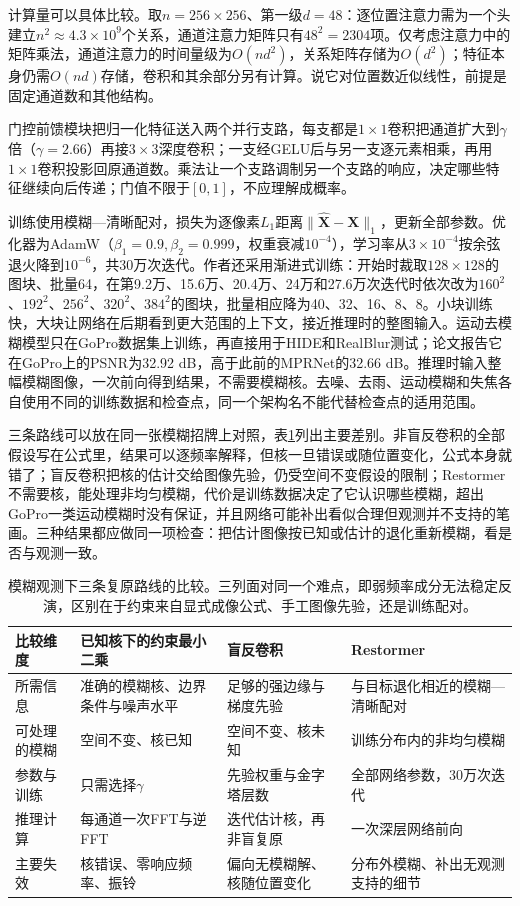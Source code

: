 计算量可以具体比较。取$n=256\times256$、第一级$d=48$：逐位置注意力需为一个头建立$n^2\approx4.3\times10^9$个关系，通道注意力矩阵只有$48^2=2304$项。仅考虑注意力中的矩阵乘法，通道注意力的时间量级为$O(nd^2)$，关系矩阵存储为$O(d^2)$；特征本身仍需$O(nd)$存储，卷积和其余部分另有计算。说它对位置数近似线性，前提是固定通道数和其他结构。

门控前馈模块把归一化特征送入两个并行支路，每支都是$1\times1$卷积把通道扩大到$\gamma$倍（$\gamma=2.66$）再接$3\times3$深度卷积；一支经GELU后与另一支逐元素相乘，再用$1\times1$卷积投影回原通道数。乘法让一个支路调制另一个支路的响应，决定哪些特征继续向后传递；门值不限于$[0,1]$，不应理解成概率。

训练使用模糊—清晰配对，损失为逐像素$L_1$距离$\lVert\widehat{\bm{X}}-\bm{X}\rVert_1$，更新全部参数。优化器为AdamW（$\beta_1=0.9,\beta_2=0.999$，权重衰减$10^{-4}$），学习率从$3\times10^{-4}$按余弦退火降到$10^{-6}$，共30万次迭代。作者还采用渐进式训练：开始时裁取$128\times128$的图块、批量64，在第9.2万、15.6万、20.4万、24万和27.6万次迭代时依次改为$160^2$、$192^2$、$256^2$、$320^2$、$384^2$的图块，批量相应降为40、32、16、8、8。小块训练快，大块让网络在后期看到更大范围的上下文，接近推理时的整图输入。运动去模糊模型只在GoPro数据集上训练，再直接用于HIDE和RealBlur测试；论文报告它在GoPro上的PSNR为32.92 dB，高于此前的MPRNet的32.66 dB。推理时输入整幅模糊图像，一次前向得到结果，不需要模糊核。去噪、去雨、运动模糊和失焦各自使用不同的训练数据和检查点，同一个架构名不能代替检查点的适用范围。

三条路线可以放在同一张模糊招牌上对照，表\ref{tab:vision-deblur-compare}列出主要差别。非盲反卷积的全部假设写在公式里，结果可以逐频率解释，但核一旦错误或随位置变化，公式本身就错了；盲反卷积把核的估计交给图像先验，仍受空间不变假设的限制；Restormer不需要核，能处理非均匀模糊，代价是训练数据决定了它认识哪些模糊，超出GoPro一类运动模糊时没有保证，并且网络可能补出看似合理但观测并不支持的笔画。三种结果都应做同一项检查：把估计图像按已知或估计的退化重新模糊，看是否与观测一致。

\begin{table}[tbp]
 \centering
 \small
 \begin{tabularx}{\linewidth}{@{}p{16mm}XXX@{}}
  \toprule
  比较维度 & 已知核下的约束最小二乘 & 盲反卷积 & Restormer\\
  \midrule
  所需信息 & 准确的模糊核、边界条件与噪声水平 & 足够的强边缘与梯度先验 & 与目标退化相近的模糊—清晰配对\\
  可处理的模糊 & 空间不变、核已知 & 空间不变、核未知 & 训练分布内的非均匀模糊\\
  参数与训练 & 只需选择$\gamma$ & 先验权重与金字塔层数 & 全部网络参数，30万次迭代\\
  推理计算 & 每通道一次FFT与逆FFT & 迭代估计核，再非盲复原 & 一次深层网络前向\\
  主要失效 & 核错误、零响应频率、振铃 & 偏向无模糊解、核随位置变化 & 分布外模糊、补出无观测支持的细节\\
  \bottomrule
 \end{tabularx}
 \caption{模糊观测下三条复原路线的比较。三列面对同一个难点，即弱频率成分无法稳定反演，区别在于约束来自显式成像公式、手工图像先验，还是训练配对。}
 \label{tab:vision-deblur-compare}
\end{table}

